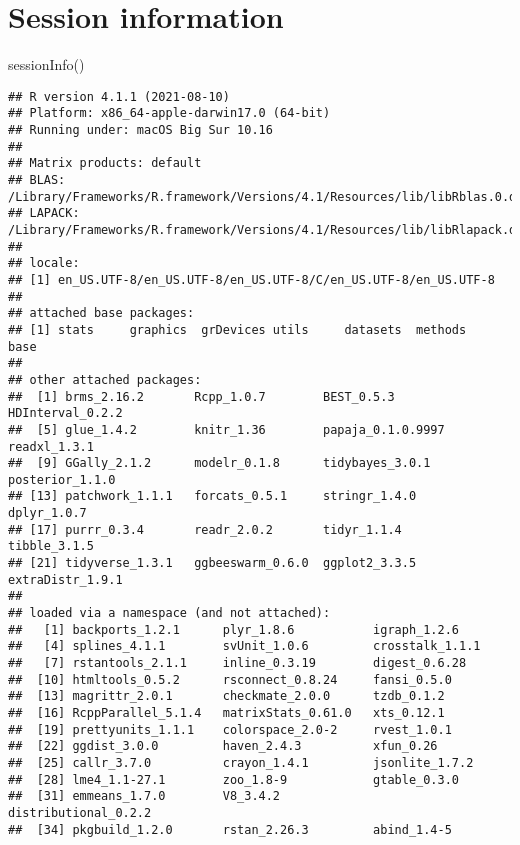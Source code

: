 \documentclass[
  11pt,
  english,
  ,doc,mask,floatsintext]{apa6}
\newenvironment{Shaded}{}{}
\newcommand{\FunctionTok}[1]{\textcolor[rgb]{0.02,0.16,0.49}{#1}}
\newcommand{\NormalTok}[1]{#1}
\begin{document}
\newpage

\hypertarget{session-information}{%
\section{Session information}\label{session-information}}

\begin{Shaded}
\begin{Highlighting}[]
\FunctionTok{sessionInfo}\NormalTok{()}
\end{Highlighting}
\end{Shaded}

\begin{verbatim}
## R version 4.1.1 (2021-08-10)
## Platform: x86_64-apple-darwin17.0 (64-bit)
## Running under: macOS Big Sur 10.16
## 
## Matrix products: default
## BLAS:   /Library/Frameworks/R.framework/Versions/4.1/Resources/lib/libRblas.0.dylib
## LAPACK: /Library/Frameworks/R.framework/Versions/4.1/Resources/lib/libRlapack.dylib
## 
## locale:
## [1] en_US.UTF-8/en_US.UTF-8/en_US.UTF-8/C/en_US.UTF-8/en_US.UTF-8
## 
## attached base packages:
## [1] stats     graphics  grDevices utils     datasets  methods   base     
## 
## other attached packages:
##  [1] brms_2.16.2       Rcpp_1.0.7        BEST_0.5.3        HDInterval_0.2.2 
##  [5] glue_1.4.2        knitr_1.36        papaja_0.1.0.9997 readxl_1.3.1     
##  [9] GGally_2.1.2      modelr_0.1.8      tidybayes_3.0.1   posterior_1.1.0  
## [13] patchwork_1.1.1   forcats_0.5.1     stringr_1.4.0     dplyr_1.0.7      
## [17] purrr_0.3.4       readr_2.0.2       tidyr_1.1.4       tibble_3.1.5     
## [21] tidyverse_1.3.1   ggbeeswarm_0.6.0  ggplot2_3.3.5     extraDistr_1.9.1 
## 
## loaded via a namespace (and not attached):
##   [1] backports_1.2.1      plyr_1.8.6           igraph_1.2.6        
##   [4] splines_4.1.1        svUnit_1.0.6         crosstalk_1.1.1     
##   [7] rstantools_2.1.1     inline_0.3.19        digest_0.6.28       
##  [10] htmltools_0.5.2      rsconnect_0.8.24     fansi_0.5.0         
##  [13] magrittr_2.0.1       checkmate_2.0.0      tzdb_0.1.2          
##  [16] RcppParallel_5.1.4   matrixStats_0.61.0   xts_0.12.1          
##  [19] prettyunits_1.1.1    colorspace_2.0-2     rvest_1.0.1         
##  [22] ggdist_3.0.0         haven_2.4.3          xfun_0.26           
##  [25] callr_3.7.0          crayon_1.4.1         jsonlite_1.7.2      
##  [28] lme4_1.1-27.1        zoo_1.8-9            gtable_0.3.0        
##  [31] emmeans_1.7.0        V8_3.4.2             distributional_0.2.2
##  [34] pkgbuild_1.2.0       rstan_2.26.3         abind_1.4-5         

\end{verbatim}
\end{document}
